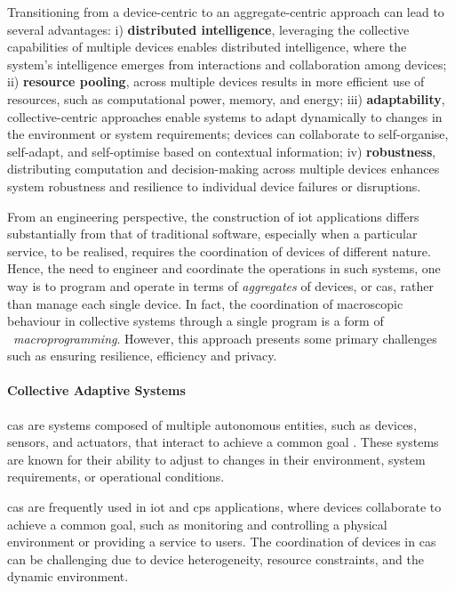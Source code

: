 Transitioning from a device-centric to an aggregate-centric approach can lead to several advantages:
    i) \textbf{distributed intelligence}, leveraging the collective capabilities of multiple devices enables distributed
        intelligence, where the system's intelligence emerges from interactions and collaboration among devices;
    ii) \textbf{resource pooling}, across multiple devices results in more efficient use of resources, such as computational
        power, memory, and energy;
    iii) \textbf{adaptability}, collective-centric approaches enable systems to adapt dynamically to changes in the
        environment or system requirements; devices can collaborate to self-organise, self-adapt, and self-optimise
        based on contextual information;
    iv) \textbf{robustness}, distributing computation and decision-making across multiple devices enhances system
        robustness and resilience to individual device failures or disruptions.

From an engineering perspective, the construction of \ac{iot} applications differs substantially from that of traditional
software, especially when a particular service, to be realised, requires the coordination of devices of different nature.
Hence, the need to engineer and coordinate the operations in such systems, one way is to program and operate in terms of
\emph{aggregates} of devices, or \ac{cas}, rather than manage each single device.
In fact, the coordination of macroscopic behaviour in collective systems through a single program is a form of
~\emph{macroprogramming}.
However, this approach presents some primary challenges such as ensuring resilience, efficiency and privacy.

\paragraph{Collective Adaptive Systems}
\label{par:collective-adaptive-systems}
\ac{cas} are systems composed of multiple autonomous entities, such as devices, sensors, and actuators, that interact to
achieve a common goal \cite{10.1145/2800835.2809508}.
These systems are known for their ability to adjust to changes in their environment, system requirements, or operational conditions.

\ac{cas} are frequently used in \ac{iot} and \ac{cps} applications, where devices collaborate to achieve a common goal,
such as monitoring and controlling a physical environment or providing a service to users.
The coordination of devices in \ac{cas} can be challenging due to device heterogeneity, resource constraints, and the
dynamic environment.

